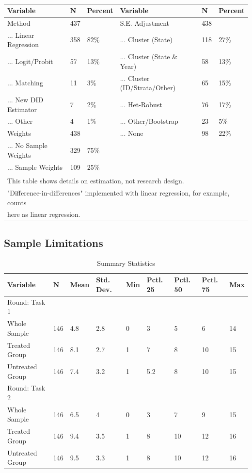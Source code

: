 \documentclass[
  letterpaper,
  DIV=11,
  numbers=noendperiod]{scrartcl}
\begin{document}
\begin{table}

\caption{}
\centering
\begin{tabular}[t]{llllll}
\toprule
Variable & N & Percent & Variable & N & Percent\\
\midrule
Method & 437 &  & S.E. Adjustment & 438 & \\
... Linear Regression & 358 & 82\% & ... Cluster (State) & 118 & 27\%\\
... Logit/Probit & 57 & 13\% & ... Cluster (State \& Year) & 58 & 13\%\\
... Matching & 11 & 3\% & ... Cluster (ID/Strata/Other) & 65 & 15\%\\
... New DID Estimator & 7 & 2\% & ... Het-Robust & 76 & 17\%\\
\addlinespace
... Other & 4 & 1\% & ... Other/Bootstrap & 23 & 5\%\\
Weights & 438 &  & ... None & 98 & 22\%\\
... No Sample Weights & 329 & 75\% &  &  & \\
... Sample Weights & 109 & 25\% &  &  & \\
\bottomrule
\multicolumn{6}{l}{\textsuperscript{} This table shows details on estimation, not research design.}\\
\multicolumn{6}{l}{"Difference-in-differences" implemented with linear regression, for example, counts}\\
\multicolumn{6}{l}{here as linear regression.}\\
\end{tabular}
\end{table}

\hypertarget{sample-limitations}{%
\subsection{Sample Limitations}\label{sample-limitations}}

\begin{table}

\caption{Summary Statistics}
\centering
\begin{tabular}[t]{lllllllll}
\toprule
Variable & N & Mean & Std. Dev. & Min & Pctl. 25 & Pctl. 50 & Pctl. 75 & Max\\
\midrule
Round: Task 1 &  &  &  &  &  &  &  & \\
Whole Sample & 146 & 4.8 & 2.8 & 0 & 3 & 5 & 6 & 14\\
Treated Group & 146 & 8.1 & 2.7 & 1 & 7 & 8 & 10 & 15\\
Untreated Group & 146 & 7.4 & 3.2 & 1 & 5.2 & 8 & 10 & 15\\
Round: Task 2 &  &  &  &  &  &  &  & \\
\addlinespace
Whole Sample & 146 & 6.5 & 4 & 0 & 3 & 7 & 9 & 15\\
Treated Group & 146 & 9.4 & 3.5 & 1 & 8 & 10 & 12 & 16\\
Untreated Group & 146 & 9.5 & 3.3 & 1 & 8 & 10 & 12 & 16\\
\bottomrule
\end{tabular}
\end{table}
\end{document}
